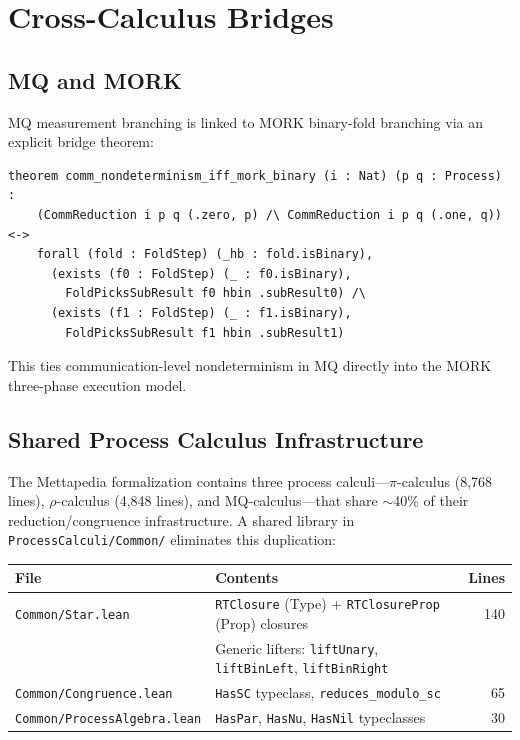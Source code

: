 \documentclass[11pt]{article}
\begin{document}
\section{Cross-Calculus Bridges}

\subsection{MQ and MORK}
MQ measurement branching is linked to MORK binary-fold branching via an explicit
bridge theorem:

\begin{lstlisting}[caption={MQ--MORK bridge (from \texttt{Interoperability.lean})}]
theorem comm_nondeterminism_iff_mork_binary (i : Nat) (p q : Process) :
    (CommReduction i p q (.zero, p) /\ CommReduction i p q (.one, q)) <->
    forall (fold : FoldStep) (_hb : fold.isBinary),
      (exists (f0 : FoldStep) (_ : f0.isBinary),
        FoldPicksSubResult f0 hbin .subResult0) /\
      (exists (f1 : FoldStep) (_ : f1.isBinary),
        FoldPicksSubResult f1 hbin .subResult1)
\end{lstlisting}

This ties communication-level nondeterminism in MQ directly into the MORK
three-phase execution model.

\subsection{Shared Process Calculus Infrastructure}

The Mettapedia formalization contains three process calculi---$\pi$-calculus
(8{,}768 lines), $\rho$-calculus (4{,}848 lines), and MQ-calculus---that
share $\sim$40\% of their reduction/congruence infrastructure.  A shared
library in \texttt{ProcessCalculi/Common/} eliminates this duplication:

\begin{center}
\small
\begin{tabular}{llr}
\toprule
\textbf{File} & \textbf{Contents} & \textbf{Lines} \\
\midrule
\texttt{Common/Star.lean} & \texttt{RTClosure} (Type) + \texttt{RTClosureProp} (Prop) closures & 140 \\
 & Generic lifters: \texttt{liftUnary}, \texttt{liftBinLeft}, \texttt{liftBinRight} & \\
\texttt{Common/Congruence.lean} & \texttt{HasSC} typeclass, \texttt{reduces\_modulo\_sc} & 65 \\
\texttt{Common/ProcessAlgebra.lean} & \texttt{HasPar}, \texttt{HasNu}, \texttt{HasNil} typeclasses & 30 \\
\bottomrule
\end{tabular}
\end{center}
\end{document}
